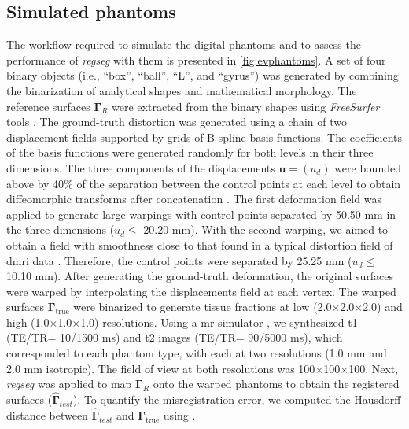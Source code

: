 \documentclass[3p,authoryear,fleqn]{elsarticle}
\providecommand{\gammaset}{\ensuremath{\boldsymbol{\Gamma}}}
\providecommand{\regseg}{\emph{regseg}}
\renewcommand{\vec}[1]{\mathbf{#1}}
\providecommand{\isores}[2][]{#2\ensuremath{\times}#2\ensuremath{\times}#2\ifthenelse{\equal{#1}{}}{}{ [#1]}\xspace}
\begin{document}
\subsection{Simulated phantoms}\label{sec:digital_phantoms}
The workflow required to simulate the digital phantoms and to assess the performance of
  \regseg{} with them is presented in \autoref{fig:evphantoms}.
A set of four binary objects (i.e., ``box'', ``ball'', ``L'',
  and ``gyrus'') was generated by combining the binarization of
  analytical shapes and mathematical morphology.
The reference surfaces $\gammaset_R$ were extracted from the binary shapes
  using \emph{FreeSurfer} tools \citep{fischl_freesurfer_2012}.
The ground-truth distortion was generated using a chain of two displacement 
  fields supported by grids of B-spline basis functions.
The coefficients of the basis functions were generated randomly for
  both levels in their three dimensions.
The three components of the displacements $\vec{u} = (u_d)$ 
  were bounded above by 40\% of the separation between the control points
  at each level to obtain diffeomorphic transforms
  after concatenation \citep{rueckert_diffeomorphic_2006}.
The first deformation field was applied to generate large warpings
  with control points separated by 50.50 mm in the three dimensions
  ($u_d\leq$ 20.20 mm).
With the second warping, we aimed to obtain a field with smoothness
  close to that found in a typical distortion field of \gls*{dmri} data
  \citep{irfanoglu_susceptibility_2011}.
Therefore, the control points were separated by 25.25 mm ($u_d\leq$ 10.10 mm).
After generating the ground-truth deformation, the original surfaces
  were warped by interpolating the displacements field at each vertex.
The warped surfaces $\gammaset_\text{true}$ were binarized to generate tissue fractions
  at low (\isores[mm]{2.0}) and high (\isores[mm]{1.0}) resolutions.
Using a \gls*{mr} simulator \citep{caruyer_phantomas_2014}, we synthesized
  \gls*{t1} (TE/TR= 10/1500 ms) and \gls*{t2} images (TE/TR= 90/5000 ms), which
  corresponded to each phantom type, with each at two resolutions 
  (1.0 mm and 2.0 mm isotropic).
The field of view at both resolutions was \isores[mm]{100}.
Next, \regseg{} was applied to map $\gammaset_R$ onto the warped phantoms to
  obtain the registered surfaces ($\hat{\gammaset}_{test}$).
To quantify the misregistration error, we computed the Hausdorff distance between
 $\hat{\gammaset}_{test}$ and $\gammaset_\text{true}$ using \citep{commandeur_vtk_2011}.
\end{document}
